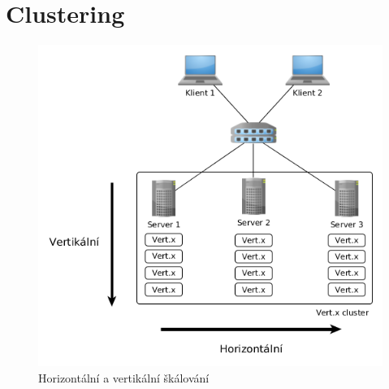 \section{Clustering}

\begin{figure}[h]
\begin{centering}
\includegraphics[scale=0.5]{obrazky/scaling_example}
\par\end{centering}
\caption{Horizontální a vertikální škálování\label{fig:scaling_example}}
\end{figure}

